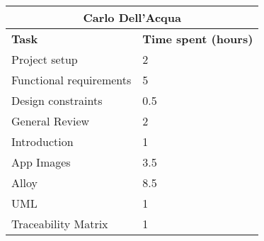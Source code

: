 \begin{table}[h]
  \centering
  \begin{tabular}{l|l}
    \multicolumn{2}{c}{\textbf{Carlo Dell'Acqua}} \\
    \hline
    \textbf{Task} & \textbf{Time spent (hours)}\\
    \hline
    Project setup & 2 \\
    Functional requirements & 5 \\
    Design constraints & 0.5 \\
    General Review & 2 \\
    Introduction & 1 \\
    App Images & 3.5 \\
    Alloy & 8.5 \\
    UML & 1 \\
    Traceability Matrix & 1 \\
  \end{tabular}
\end{table}